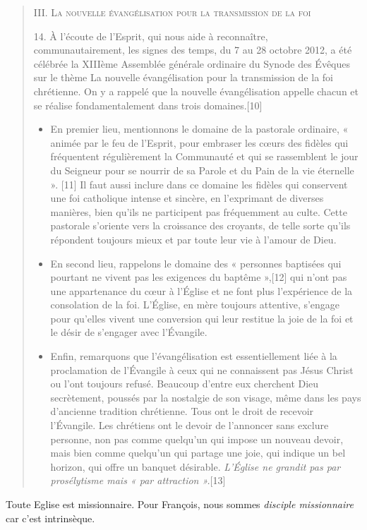 \begin{quote}
\textsc{III. La nouvelle évangélisation pour la transmission de la foi}

14. À l’écoute de l’Esprit, qui nous aide à reconnaître, communautairement, les signes des temps, du 7 au 28 octobre 2012, a été célébrée la XIIIème Assemblée générale ordinaire du Synode des Évêques sur le thème La nouvelle évangélisation pour la transmission de la foi chrétienne. On y a rappelé que la nouvelle évangélisation appelle chacun et se réalise fondamentalement dans trois domaines.[10] 
\begin{itemize}
\item En premier lieu, mentionnons le domaine de la pastorale ordinaire, « animée par le feu de l’Esprit, pour embraser les cœurs des fidèles qui fréquentent régulièrement la Communauté et qui se rassemblent le jour du Seigneur pour se nourrir de sa Parole et du Pain de la vie éternelle ».
 [11] Il faut aussi inclure dans ce domaine les fidèles qui conservent une foi catholique intense et sincère, en l’exprimant de diverses manières, bien qu’ils ne participent pas fréquemment au culte. Cette pastorale s’oriente vers la croissance des croyants, de telle sorte qu’ils répondent toujours mieux et par toute leur vie à l’amour de Dieu. 
\item  En second lieu, rappelons le domaine des « personnes baptisées qui pourtant ne vivent pas les exigences du baptême »,[12] qui n’ont pas une appartenance du cœur à l’Église et ne font plus l’expérience de la consolation de la foi. L’Église, en mère toujours attentive, s’engage pour qu’elles vivent une conversion qui leur restitue la joie de la foi et le désir de s’engager avec l’Évangile.

\item  Enfin, remarquons que l’évangélisation est essentiellement liée à la proclamation de l’Évangile à ceux qui ne connaissent pas Jésus Christ ou l’ont toujours refusé. Beaucoup d’entre eux cherchent Dieu secrètement, poussés par la nostalgie de son visage, même dans les pays d’ancienne tradition chrétienne. Tous ont le droit de recevoir l’Évangile. Les chrétiens ont le devoir de l’annoncer sans exclure personne, non pas comme quelqu’un qui impose un nouveau devoir, mais bien comme quelqu’un qui partage une joie, qui indique un bel horizon, qui offre un banquet désirable. \textit{L’Église ne grandit pas par prosélytisme mais « par attraction ».}[13]
\end{itemize}

\end{quote}
\begin{Synthesis}
Toute Eglise est missionnaire. Pour François, nous sommes \textit{disciple missionnaire} car c'est intrinsèque.
\end{Synthesis}

